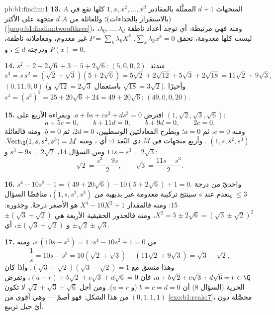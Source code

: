 \begin{solution}{pb:b1:findim:1}
\textbf{13.} المتجهات $d + 1$ الممثَّلة بالمقادير $1, x, x^2, \dots, x^{d}$ كلها
تقع في $A$ (بالاستقرار بالجداءات)؛ وللعائلة  من $A$
$d$ متجهة على الأكثر (\cref{prop:b1:findim:twoofthree})، ومنه فهي
مرتبطة: أي توجد أعداد ناطقة $\lambda_0, \dots, \lambda_d$،
ليست كلها معدومة، تحقق $\sum_k \lambda_k x^k = 0$.  $P
= \sum_k \lambda_k X^k$ غير معدوم، ومعاملاته ناطقة،
ودرجته $\leq d$، و $P(x) = 0$.

\textbf{14.} $s^2 = 2 + 2\sqrt6 + 3 = 5 + 2\sqrt6$: 
$(5, 0, 0, 2)$. عندئذ
\[
s^3 = s\,s^2 = (\sqrt2 + \sqrt3)(5 + 2\sqrt6)
= 5\sqrt2 + 2\sqrt{12} + 5\sqrt3 + 2\sqrt{18}
= 11\sqrt2 + 9\sqrt3 ,
\]
 $(0, 11, 9, 0)$ (باستعمال $\sqrt{12} = 2\sqrt3$ و
$\sqrt{18} = 3\sqrt2$). وأخيرًا $s^4 = (s^2)^2 = 25 + 20\sqrt6 +
24 = 49 + 20\sqrt6$:  $(49, 0, 0, 20)$.

\textbf{15.} افترض $a + bs + cs^2 + ds^3 = 0$. وبقراءة 
الأربع على $(1, \sqrt2, \sqrt3, \sqrt6)$:
\[
a + 5c = 0,\qquad b + 11d = 0,\qquad b + 9d = 0,\qquad 2c = 0 .
\]
ومنه $c = 0$، ثم $a = 0$؛ وبطرح المعادلتين الوسطيين، $2d =
0$، ثم $b = 0$: ومنه فالعائلة $(1, s, s^2, s^3)$ . وأربع متجهات 
في $M$ ذي البُعد $4$: أي ، ومنه
$\operatorname{Vect}_\Q(1, s, s^2, s^3) = M$. ومن السؤال 14،
$s^3 - 9s = 2\sqrt2$ و $11s - s^3 = 2\sqrt3$:
\[
\sqrt2 = \frac{s^3 - 9s}{2},
\qquad
\sqrt3 = \frac{11s - s^3}{2} .
\]

\textbf{16.} $s^4 - 10s^2 + 1 = (49 + 20\sqrt6) - 10(5 +
2\sqrt6) + 1 = 0$.  واحديّ من درجة $\leq 3$
ينعدم عند $s$ سينتج تركيبة معدومة غير بديهية من
$(1, s, s^2, s^3)$، مناقضًا السؤال 15: ومنه فالمقدار $X^4 - 10X^2 + 1$
هو الأصغر درجةً. وجذوره: $X^2 = 5 \pm 2\sqrt6 = (\sqrt3 \pm
\sqrt2)^2$، ومنه فالجذور الحقيقية الأربعة هي $\pm(\sqrt3 + \sqrt2)$ و
$\pm(\sqrt3 - \sqrt2)$، أي $\pm\sqrt2 \pm \sqrt3$.

\textbf{17.} من $s^4 - 10s^2 + 1 = 0$: $s\,(10s - s^3) = 1$، ومنه
\[
\frac1s = 10s - s^3 = 10(\sqrt2 + \sqrt3) - (11\sqrt2 + 9\sqrt3)
= \sqrt3 - \sqrt2 ,
\]
وهذا متسق مع $(\sqrt3 + \sqrt2)(\sqrt3 - \sqrt2) = 1$. وإذا كان $a +
b\sqrt2 + c\sqrt3 + d\sqrt6 = r \in \Q$، فإن $(a - r) + b\sqrt2
+ c\sqrt3 + d\sqrt6 = 0$، وتفرض الحرية (السؤال 8) أن $b = c
= d = 0$ (و $a = r$). ومن أجل $\sqrt2 + \sqrt3 + \sqrt6$ لا تكون
 $(0, 1, 1, 1)$ من هذا الشكل: فهو أصمّ ---
وهي  أقوى من \cref{exo:b1:reals:7}، محصَّلة دون
أيّ حيل تربيع.


\end{solution}
